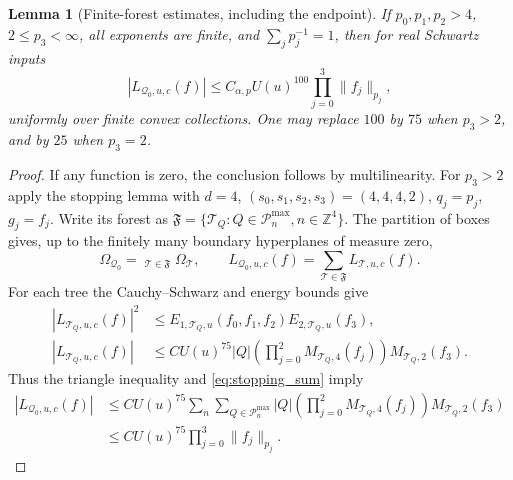 \documentclass[12pt,reqno]{amsart}
\theoremstyle{plain}
\newtheorem{lemma}[theorem]{Lemma}
\theoremstyle{definition}
\theoremstyle{remark}
\numberwithin{equation}{section}
\newcommand{\Z}{\mathbb Z}
\newcommand{\T}{\mathcal T}
\begin{document}
\begin{lemma}[Finite-forest estimates, including the endpoint]
\label{lem:forest_bound}
If $p_0,p_1,p_2>4$, $2\le p_3<\infty$, all exponents are finite,
and $\sum_jp_j^{-1}=1$, then for real Schwartz inputs
\[
 |L_{\mathcal Q_0,u,c}(f)|\le C_{\alpha,p}U(u)^{100}
                              \prod_{j=0}^3\|f_j\|_{p_j},
\]
uniformly over finite convex collections. One may replace $100$ by
$75$ when $p_3>2$, and by $25$ when $p_3=2$.
\end{lemma}
\begin{proof}
If any function is zero, the conclusion follows by multilinearity.
For $p_3>2$ apply the stopping lemma with $d=4$,
$(s_0,s_1,s_2,s_3)=(4,4,4,2)$, $q_j=p_j$, $g_j=f_j$.
Write its forest as $\mathfrak F=\{\T_Q:Q\in\mathcal P_n^{\max},
n\in\Z^4\}$. The partition of boxes gives, up to the finitely
many boundary hyperplanes of measure zero,
\[
 \Omega_{\mathcal Q_0}=\mathop{\dot\bigcup}_{\T\in\mathfrak F}
               \Omega_\T,\qquad
 L_{\mathcal Q_0,u,c}(f)=\sum_{\T\in\mathfrak F}L_{\T,u,c}(f).
\]
For each tree the Cauchy--Schwarz and energy bounds give
\begin{align*}
 |L_{\T_Q,u,c}(f)|^2
 &\le E_{1,\T_Q,u}(f_0,f_1,f_2)E_{2,\T_Q,u}(f_3),\\
 |L_{\T_Q,u,c}(f)|
 &\le C U(u)^{75}|Q|
               \left(\prod_{j=0}^2M_{\T_Q,4}(f_j)\right)
               M_{\T_Q,2}(f_3).
\end{align*}
Thus the triangle inequality and \eqref{eq:stopping_sum} imply
\begin{align*}
 |L_{\mathcal Q_0,u,c}(f)|
 &\le C U(u)^{75}\sum_n\sum_{Q\in\mathcal P_n^{\max}}
       |Q|\left(\prod_{j=0}^2M_{\T_Q,4}(f_j)\right)
                    M_{\T_Q,2}(f_3)\\
 &\le C U(u)^{75}\prod_{j=0}^3\|f_j\|_{p_j}.
\end{align*}


\end{proof}
\end{document}

